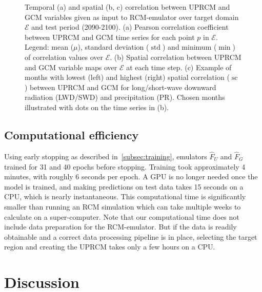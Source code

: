 \documentclass[a4paper,11pt,oneside]{report}
\begin{document}
\begin{figure}[!h]
\begin{subfigure}[b]{\columnwidth}
        \end{subfigure}
        \hfill
        \caption[]
        {\small Temporal (a) and spatial (b, c) correlation between UPRCM and GCM variables given as input to RCM-emulator over target domain $\mathcal{E}$ and test period (2090-2100). (a) Pearson correlation coefficient between UPRCM and GCM time series for each point $p$ in $\mathcal{E}$. Legend: mean ($\mu$), standard deviation ($\operatorname{std}$) and minimum ($\min$) of correlation values over $\mathcal{E}$. (b) Spatial correlation between UPRCM and GCM variable maps over $\mathcal{E}$ at each time step. (c) Example of months with lowest (left) and highest (right) spatial correlation ($\operatorname{sc}$) between UPRCM and GCM for long/short-wave downward radiation (LWD/SWD) and precipitation (PR). Chosen months illustrated with dots on the time series in (b).} 
        \label{fig:corr-GCM-RCM}
    \end{figure}


\section{Computational efficiency}\label{sec:computational-efficiency}
Using early stopping as described in~\autoref{subsec:training}, emulators $\hat{F}_U$ and $\hat{F}_G$ trained for 31 and 40 epochs before stopping. Training took approximately 4 minutes, with roughly 6 seconds per epoch. A GPU is no longer needed once the model is trained, and making predictions on test data takes 15 seconds on a CPU, which is nearly instantaneous. This computational time is significantly smaller than running an RCM simulation which can take multiple weeks to calculate on a super-computer. Note that our computational time does not include data preparation for the RCM-emulator. But if the data is readily obtainable and a correct data processing pipeline is in place, selecting the target region and creating the UPRCM takes only a few hours on a CPU.



\chapter{Discussion}

\end{document}
